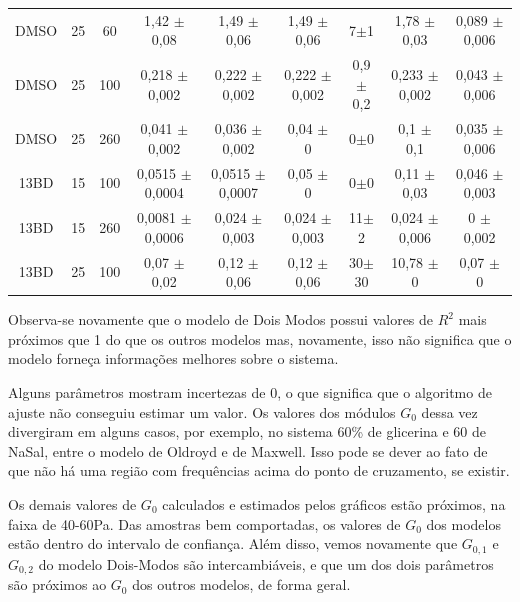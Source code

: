 \begin{table}[h]
\begin{adjustbox}{angle=90}
{\begin{tabular}{c c c | c c c c c c}
			DMSO    & 25         & 60       & 1,42    \(\pm\) 0,08   & 1,49     \(\pm\) 0,06   & 1,49      \(\pm\) 0,06    & 7\(\pm\)1     & 1,78        \(\pm\) 0,03   & 0,089       \(\pm\) 0,006  \\
			DMSO    & 25         & 100      & 0,218   \(\pm\) 0,002  & 0,222    \(\pm\) 0,002  & 0,222     \(\pm\) 0,002   & 0,9\(\pm\)0,2 & 0,233       \(\pm\) 0,002  & 0,043       \(\pm\) 0,006  \\
			DMSO    & 25         & 260      & 0,041   \(\pm\) 0,002  & 0,036    \(\pm\) 0,002  & 0,04      \(\pm\) 0       & 0\(\pm\)0     & 0,1         \(\pm\) 0,1    & 0,035       \(\pm\) 0,006  \\
			13BD    & 15         & 100      & 0,0515  \(\pm\) 0,0004 & 0,0515   \(\pm\) 0,0007 & 0,05      \(\pm\) 0       & 0\(\pm\)0     & 0,11        \(\pm\) 0,03   & 0,046       \(\pm\) 0,003  \\
			13BD    & 15         & 260      & 0,0081  \(\pm\) 0,0006 & 0,024    \(\pm\) 0,003  & 0,024     \(\pm\) 0,003   & 11\(\pm\)2    & 0,024       \(\pm\) 0,006  & 0           \(\pm\) 0,002  \\
			13BD    & 25         & 100      & 0,07    \(\pm\) 0,02   & 0,12     \(\pm\) 0,06   & 0,12      \(\pm\) 0,06   & 30\(\pm\)30   & 10,78       \(\pm\) 0      & 0,07        \(\pm\) 0		\\ \bottomrule
		\end{tabular} 
	
	}{} \end{adjustbox}
\end{table} 


		\FloatBarrier
		
		Observa-se novamente que o modelo de Dois Modos possui valores de \(R^2\) mais próximos que 1 do que os outros modelos mas, novamente, isso não significa que o modelo forneça informações melhores sobre o sistema.
		
		Alguns parâmetros mostram incertezas de 0, o que significa que o algoritmo de ajuste não conseguiu estimar um valor. Os valores dos módulos \(G_0\) dessa vez divergiram em alguns casos, por exemplo, no sistema 60\% de glicerina e 60 \mM{} de NaSal, entre o modelo de Oldroyd e de Maxwell. Isso pode se dever ao fato de que não há uma região com frequências acima do ponto de cruzamento, se existir.
		
		Os demais valores de \(G_0\) calculados e estimados pelos gráficos estão próximos, na faixa de 40-60Pa. Das amostras bem comportadas, os valores de \(G_0\) dos modelos estão dentro do intervalo de confiança. Além disso, vemos novamente que \(G_{0,1}\) e \(G_{0,2}\) do modelo Dois-Modos são intercambiáveis, e que um dos dois parâmetros são próximos ao \(G_0\) dos outros modelos, de forma geral.
		
